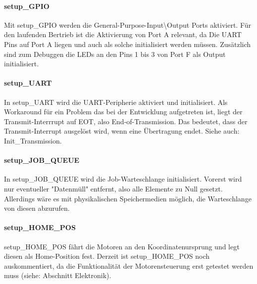 \documentclass{scrartcl}
\begin{document}
\paragraph{setup\_GPIO}
Mit setup\_GPIO werden die General-Purpose-Input\textbackslash Output Ports aktiviert. Für den laufenden Bertrieb ist die Aktivierung von Port A relevant, da Die UART Pins auf Port A liegen und auch als solche initialisiert werden müssen. Zusätzlich sind zum Debuggen die  LEDs an den Pins 1 bis 3 von Port F als Output initialisiert. 

\paragraph{setup\_UART}
In setup\_UART wird die UART-Peripherie aktiviert und initialisiert. Als Workaround für ein Problem das bei der Entwicklung aufgetreten ist, liegt der Transmit-Interrrupt auf EOT, also End-of-Transmission. Das bedeutet, dass der Transmit-Interrupt ausgelöst wird, wenn eine Übertragung endet. Siehe auch: Init\_Transmission. 

\paragraph{setup\_JOB\_QUEUE}
In setup\_JOB\_QUEUE wird die Job-Warteschlange initialisiert. Vorerst wird nur eventueller "Datenmüll" entfernt, also alle Elemente zu Null gesetzt. Allerdings wäre es mit physikalischen Speichermedien möglich, die Warteschlange von diesen abzurufen.

\paragraph{setup\_HOME\_POS}
setup\_HOME\_POS fährt die Motoren an den Koordinatenursprung und legt diesen als Home-Position fest. Derzeit ist setup\_HOME\_POS noch auskommentiert, da die Funktionalität der Motorensteuerung erst getestet werden muss (siehe: Abschnitt Elektronik).
\end{document}
